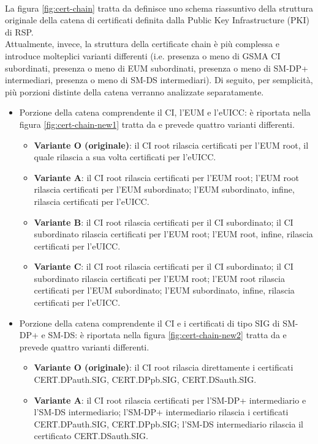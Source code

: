\documentclass[10pt, twoside, openany]{book}
\begin{document}
\\La figura \ref{fig:cert-chain} tratta da \cite{GSMA-docs-old} definisce uno schema riassuntivo della struttura originale della catena di certificati definita dalla Public Key Infrastructure (PKI) di RSP.\\
Attualmente, invece, la struttura della certificate chain è più complessa e introduce molteplici varianti differenti (i.e. presenza o meno di GSMA CI subordinati, presenza o meno di EUM subordinati, presenza o meno di SM-DP+ intermediari, presenza o meno di SM-DS intermediari). Di seguito, per semplicità, più porzioni distinte della catena verranno analizzate separatamente.
\begin{itemize}
\item Porzione della catena comprendente il CI, l'EUM e l'eUICC: è riportata nella figura \ref{fig:cert-chain-new1} tratta da \cite{GSMA-docs-new} e prevede quattro varianti differenti.
\begin{itemize}
\item \textbf{Variante O (originale)}: il CI root rilascia certificati per l'EUM root, il quale rilascia a sua volta certificati per l'eUICC.
\item \textbf{Variante A}: il CI root rilascia certificati per l'EUM root; l'EUM root rilascia certificati per l'EUM subordinato; l'EUM subordinato, infine, rilascia certificati per l'eUICC.
\item \textbf{Variante B}: il CI root rilascia certificati per il CI subordinato; il CI subordinato rilascia certificati per l'EUM root; l'EUM root, infine, rilascia certificati per l'eUICC.
\item \textbf{Variante C}: il CI root rilascia certificati per il CI subordinato; il CI subordinato rilascia certificati per l'EUM root; l'EUM root rilascia certificati per l'EUM subordinato; l'EUM subordinato, infine, rilascia certificati per l'eUICC.
\end{itemize}
\item Porzione della catena comprendente il CI e i certificati di tipo SIG di SM-DP+ e SM-DS: è riportata nella figura \ref{fig:cert-chain-new2} tratta da \cite{GSMA-docs-new} e prevede quattro varianti differenti.
\begin{itemize}
\item \textbf{Variante O (originale)}: il CI root rilascia direttamente i certificati CERT.DPauth.SIG, CERT.DPpb.SIG, CERT.DSauth.SIG.
\item \textbf{Variante A}: il CI root rilascia certificati per l'SM-DP+ intermediario e l'SM-DS intermediario; l'SM-DP+ intermediario rilascia i certificati  CERT.DPauth.SIG, CERT.DPpb.SIG; l'SM-DS intermediario rilascia il certificato CERT.DSauth.SIG.

\end{itemize}
\end{itemize}
\end{document}
